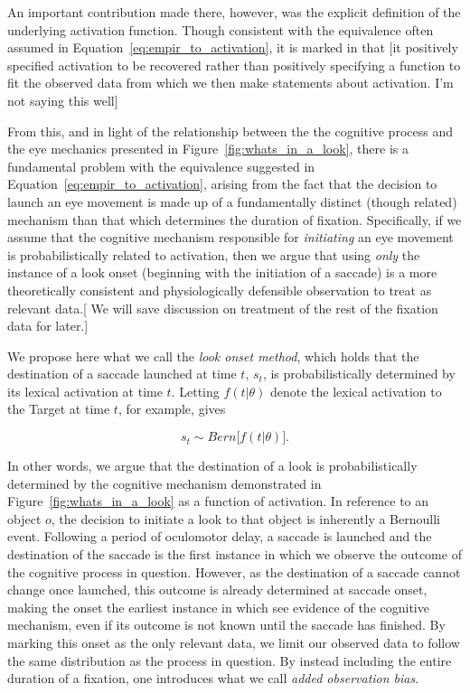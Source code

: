 An important contribution made there, however, was the explicit definition of the underlying activation function. Though consistent with the equivalence often assumed in Equation~\ref{eq:empir_to_activation}, it is marked in that [it positively specified activation to be recovered rather than positively specifying a function to fit the observed data from which we then make statements about activation. I'm not saying this well]

From this, and in light of the relationship between the the cognitive process and the eye mechanics presented in Figure~\ref{fig:whats_in_a_look}, there is a fundamental problem with the equivalence suggested in Equation~\ref{eq:empir_to_activation}, arising from the fact that the decision to launch an eye movement is made up of a fundamentally distinct (though related) mechanism than that which determines the duration of fixation. Specifically, if we assume that the cognitive mechanism responsible for \textit{initiating} an eye movement is probabilistically related to activation, then we argue that using \textit{only} the instance of a look onset (beginning with the initiation of a saccade) is a more theoretically consistent and physiologically defensible observation to treat as relevant data.[ We will save discussion on treatment of the rest of the fixation data for later.]


We propose here what we call the \textit{look onset method}, which holds that the destination of a saccade launched at time $t$, $s_t$, is probabilistically determined by its lexical activation at time $t$. Letting $f(t|\theta)$ denote the lexical activation to the Target at time $t$, for example, gives

\begin{equation}\label{eq:onset_distribution}
s_t \sim Bern \big[ f( t  |  \theta) \big].
\end{equation}

In other words, we argue that the destination of a look is probabilistically determined by the cognitive mechanism demonstrated in Figure~\ref{fig:whats_in_a_look} as a function of activation. In reference to an object $o$, the decision to initiate a look to that object is inherently a Bernoulli event. Following a period of oculomotor delay, a saccade is launched and the destination of the saccade is the first instance in which we observe the outcome of the cognitive process in question. However, as the destination of a saccade cannot change once launched, this outcome is already determined at saccade onset, making the onset the earliest instance in which see evidence of the cognitive mechanism, even if its outcome is not known until the saccade has finished. By marking this onset as the only relevant data, we limit our observed data to follow the same distribution as the process in question. By instead including the entire duration of a fixation, one introduces what we call \textit{added observation bias}.

